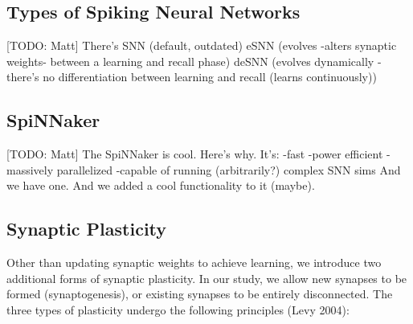 \documentclass[journal]{./sty/IEEEtran}
\begin{document}
\subsection{Types of Spiking Neural Networks}
[TODO: Matt]
There's SNN (default, outdated)
eSNN (evolves -alters synaptic weights- between a learning and recall phase)
deSNN (evolves dynamically - there's no differentiation between learning and recall (learns continuously))

\subsection{SpiNNaker}
[TODO: Matt]
The SpiNNaker is cool. 
Here's why. It's:
 -fast
 -power efficient
 -massively parallelized
 -capable of running (arbitrarily?) complex SNN sims
And we have one. 
And we added a cool functionality to it (maybe). 

\subsection{Synaptic Plasticity}
Other than updating synaptic weights to achieve learning, we introduce two additional forms of synaptic plasticity. 
In our study, we allow new synapses to be formed (synaptogenesis), or existing synapses to be entirely disconnected. The three types of plasticity undergo the following principles (Levy 2004):
\end{document}
